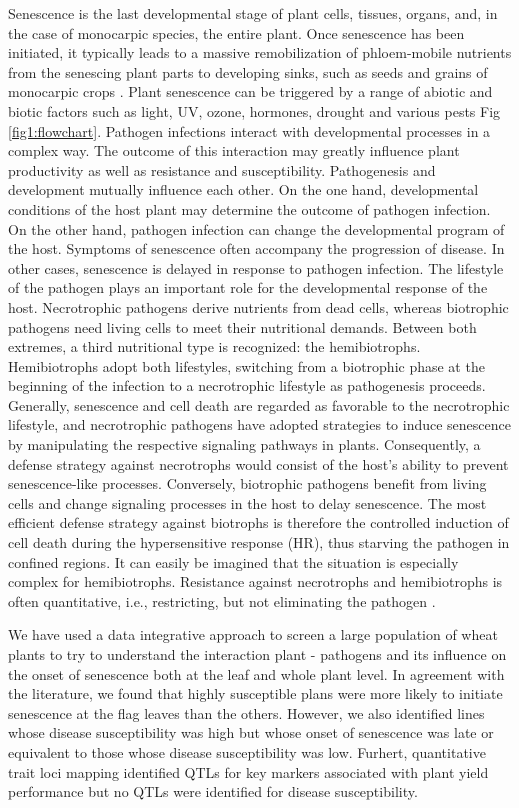 \documentclass{frontiersSCNS} %
\begin{document}
Senescence is the last developmental stage of plant cells, tissues, organs, and, in the case of monocarpic species, the entire plant. Once senescence has been initiated, it typically leads to a massive remobilization of phloem-mobile nutrients from the senescing plant parts to developing sinks, such as seeds and grains of monocarpic crops \cite{Distelfeld27012014}. Plant senescence can be triggered by a range of abiotic and biotic factors such as light, UV, ozone, hormones, drought and various pests \cite{PLB:PLB114} Fig \ref{fig1:flowchart}. Pathogen infections interact with developmental processes in a complex way. The outcome of this interaction may greatly influence plant productivity as well as resistance and susceptibility. Pathogenesis and development mutually influence each other. On the one hand, developmental conditions of the host plant may determine the outcome of pathogen infection. On the other hand, pathogen infection can change the developmental program of the host. Symptoms of senescence often accompany the progression of disease. In other cases, senescence is delayed in response to pathogen infection. The lifestyle of the pathogen plays an important role for the developmental response of the host. Necrotrophic pathogens derive nutrients from dead cells, whereas biotrophic pathogens need living cells to meet their nutritional demands. Between both extremes, a third nutritional type is recognized: the hemibiotrophs. Hemibiotrophs adopt both lifestyles, switching from a biotrophic phase at the beginning of the infection to a necrotrophic lifestyle as pathogenesis proceeds. Generally, senescence and cell death are regarded as favorable to the necrotrophic lifestyle, and necrotrophic pathogens have adopted strategies to induce senescence by manipulating the respective signaling pathways in plants. Consequently, a defense strategy against necrotrophs would consist of the host’s ability to prevent senescence-like processes. Conversely, biotrophic pathogens benefit from living cells and change signaling processes in the host to delay senescence. The most efficient defense strategy against biotrophs is therefore the controlled induction of cell death during the hypersensitive response (HR), thus starving the pathogen in confined regions. It can easily be imagined that the situation is especially complex for hemibiotrophs. Resistance against necrotrophs and hemibiotrophs is often quantitative, i.e., restricting, but not eliminating the pathogen \cite{plants4030449}.

We have used a data integrative approach to screen a large population of wheat plants to try to understand the interaction plant - pathogens and its influence on the onset of senescence both at the leaf and whole plant level. In agreement with the literature, we found that highly susceptible plans were more likely to initiate senescence at the flag leaves than the others. However, we also identified lines whose disease susceptibility was high but whose onset of senescence was late or equivalent to those whose disease susceptibility was low. Furhert, quantitative trait loci mapping identified QTLs for key markers associated with plant yield performance but no QTLs were identified for disease susceptibility. 
\end{document}
